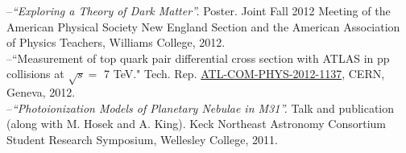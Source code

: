 \begin{itemize}
{%
--\textit{``Exploring a Theory of Dark Matter''.} Poster. Joint Fall 2012 Meeting of the American Physical Society New England Section and the American Association of Physics Teachers, Williams College, 2012.\\
--{``Measurement of top quark pair differential cross section with ATLAS in pp collisions at $\sqrt{s}=$ 7 TeV." Tech. Rep. \href{https://cds.cern.ch/record/1470588/}{ATL-COM-PHYS-2012-1137}, CERN, Geneva, 2012.}\\
--\textit{``Photoionization Models of Planetary Nebulae in M31''.} Talk and publication (along with M. Hosek and A. King). Keck Northeast Astronomy Consortium Student Research Symposium, Wellesley College, 2011.
}
 \end{itemize}

